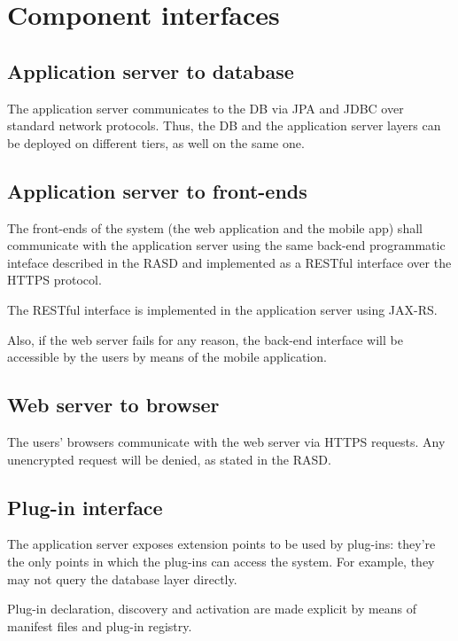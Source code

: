 \section{Component interfaces}
\label{sec:component-interfaces}

\subsection{Application server to database}
The application server communicates to the DB via JPA and JDBC over standard network protocols. Thus, the DB and the application server layers can be deployed on different tiers, as well on the same one.

\subsection{Application server to front-ends}
The front-ends of the system (the web application and the mobile app) shall communicate with the application server using the same back-end programmatic inteface described in the RASD and implemented as a RESTful interface over the HTTPS protocol.

The RESTful interface is implemented in the application server using JAX-RS.

Also, if the web server fails for any reason, the back-end interface will be accessible by the users by means of the mobile application.

\subsection{Web server to browser}
The users' browsers communicate with the web server via HTTPS requests. Any unencrypted request will be denied, as stated in the RASD.

\subsection{Plug-in interface}
The application server exposes extension points to be used by plug-ins: they're the only points in which the plug-ins can access the system. For example, they may not query the database layer directly.

Plug-in declaration, discovery and activation are made explicit by means of manifest files and plug-in registry.
